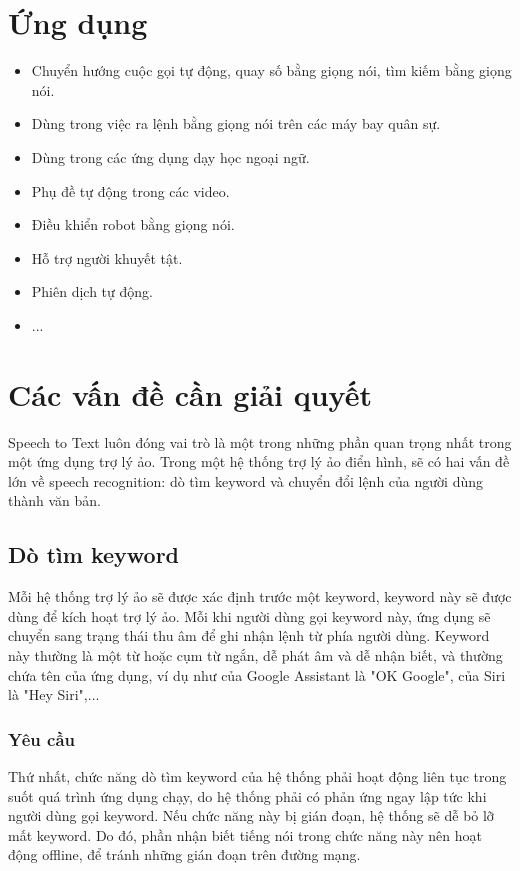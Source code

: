 \section{Ứng dụng}

\begin{itemize}
    \item Chuyển hướng cuộc gọi tự động, quay số bằng giọng nói, tìm kiếm bằng giọng nói.
    \item Dùng trong việc ra lệnh bằng giọng nói trên các máy bay quân sự.
    \item Dùng trong các ứng dụng dạy học ngoại ngữ.
    \item Phụ đề tự động trong các video.
    \item Điều khiển robot bằng giọng nói.
    \item Hỗ trợ người khuyết tật.
    \item Phiên dịch tự động.
    \item ...
\end{itemize}

\section{Các vấn đề cần giải quyết}

Speech to Text luôn đóng vai trò là một trong những phần quan trọng nhất trong một ứng dụng trợ lý ảo. Trong một hệ thống trợ lý ảo điển hình, sẽ có hai vấn đề lớn về speech recognition: dò tìm keyword và chuyển đổi lệnh của người dùng thành văn bản.

\subsection{Dò tìm keyword}

Mỗi hệ thống trợ lý ảo sẽ được xác định trước một keyword, keyword này sẽ được dùng để kích hoạt trợ lý ảo. Mỗi khi người dùng gọi keyword này, ứng dụng sẽ chuyển sang trạng thái thu âm để ghi nhận lệnh từ phía người dùng. Keyword này thường là một từ hoặc cụm từ ngắn, dễ phát âm và dễ nhận biết, và thường chứa tên của ứng dụng, ví dụ như của Google Assistant là "OK Google", của Siri là "Hey Siri",...

\subsubsection{Yêu cầu}

Thứ nhất, chức năng dò tìm keyword của hệ thống phải hoạt động liên tục trong suốt quá trình ứng dụng chạy, do hệ thống phải có phản ứng ngay lập tức khi người dùng gọi keyword. Nếu chức năng này bị gián đoạn, hệ thống sẽ dễ bỏ lỡ mất keyword. Do đó, phần nhận biết tiếng nói trong chức năng này nên hoạt động offline, để tránh những gián đoạn trên đường mạng.

